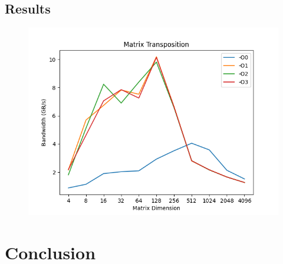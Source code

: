 \documentclass{article}
\begin{document}
\subsection{Results}
\begin{figure}[H]
    \centering
    \includegraphics[]{report/img/output.png}
    \caption{}
\end{figure}
\section{Conclusion}
\end{document}
